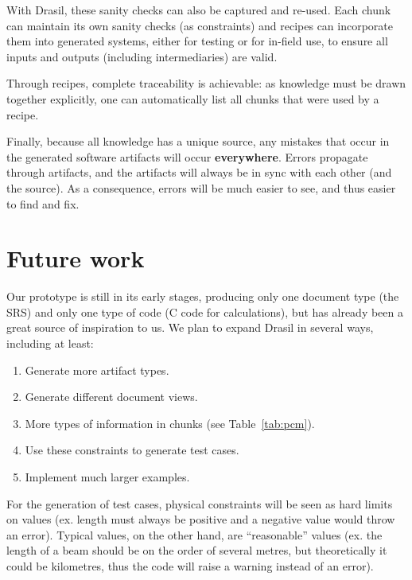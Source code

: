 \documentclass{sig-alternate-05-2015}
\newcommand{\lss}{Drasil}
\begin{document}
With \lss, these sanity checks can also be captured and re-used.  Each chunk
can maintain its own sanity checks (as constraints) and recipes can incorporate
them into generated systems, either for testing or for in-field use, to ensure
all inputs and outputs (including intermediaries) are valid.

Through recipes, complete traceability is achievable: as knowledge must be
drawn together explicitly, one can automatically list all chunks that were
used by a recipe.

Finally, because all knowledge has a unique source, any mistakes that occur in
the generated software artifacts will occur \textbf{everywhere}. Errors
propagate through artifacts, and the artifacts will always be in sync with each
other (and the source). As a consequence, errors will be much easier to see,
and thus easier to find and fix.  

\section{Future work} \label{sec:todo}

Our prototype is still in its early stages, producing only one document type
(the SRS) and only one type of code (C code for calculations), but has 
already been a great source of inspiration to us. We plan to expand
\lss{} in several ways, including at least:
\begin{enumerate}
\setlength{\itemsep}{0pt}
\setlength{\parskip}{0pt}
\setlength{\parsep}{0pt}
\item Generate more artifact types. %
\item Generate different document views. %
\item More types of information in chunks (see Table~\ref{tab:pcm}).
\item Use these constraints to generate test cases.
\item Implement much larger examples.
\end{enumerate}

For the generation of test cases, physical constraints will be seen as hard
limits on values (ex. length must always be positive and a negative value would
throw an error). Typical values, on the other hand, are ``reasonable'' values
(ex. the length of a beam should be on the order of several metres, but
theoretically it could be kilometres, thus the code will raise a warning
instead of an error).
\end{document}

